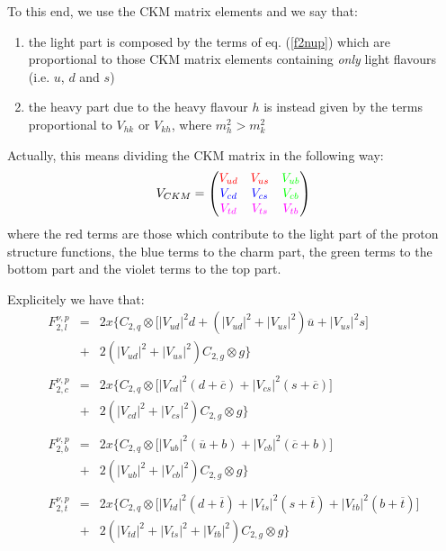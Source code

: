 \documentclass[10pt,a4paper]{article}
\begin{document}
To this end, we use the CKM matrix elements and we say that:
\begin{enumerate}
\item the light part is composed by the terms of eq. (\ref{f2nup})
  which are proportional to those CKM matrix elements containing
  \textit{only} light flavours (i.e. $u$, $d$ and $s$)
\item the heavy part due to the heavy flavour $h$ is instead given by
  the terms proportional to $V_{hk}$ or $V_{kh}$, where $m_h^2 >
  m_k^2$
\end{enumerate}
Actually, this means dividing the CKM matrix in the following way:
\begin{equation}
V_{CKM} =
\begin{pmatrix}
{\color{rosso}V_{ud}} & {\color{rosso}V_{us}} & {\color{verde}V_{ub}}\\
{\color{blu}V_{cd}} & {\color{blu}V_{cs}} & {\color{verde}V_{cb}}\\
{\color{viola}V_{td}} & {\color{viola}V_{ts}} & {\color{viola}V_{tb}}
\end{pmatrix}
\end{equation}
where the {\color{rosso} red terms} are those which contribute to the
{\color{rosso} light part} of the proton structure functions, the
{\color{blu} blue terms} to the {\color{blu} charm part}, the
{\color{verde} green terms} to the {\color{verde} bottom part} and the
{\color{viola} violet terms} to the {\color{viola} top part}.

Explicitely we have that:
\begin{equation}
\begin{array}{rcl}  
F_{2,l}^{\nu,p} &=& 2x\Big\{C_{2,q}\otimes\Big[|V_{ud}|^2 d +\left(|V_{ud}|^2+|V_{us}|^2\right)\overline{u} + |V_{us}|^2 s\Big]\\
                &+& 2\left(|V_{ud}|^2+|V_{us}|^2\right)C_{2,g}\otimes g\Big\}\\
\\
F_{2,c}^{\nu,p} &=& 2x\Big\{C_{2,q}\otimes\Big[|V_{cd}|^2(d+\overline{c}) + |V_{cs}|^2 (s+\overline{c})\Big]\\
                &+& 2\left(|V_{cd}|^2+|V_{cs}|^2\right)C_{2,g}\otimes g\Big\}\\
\\
F_{2,b}^{\nu,p} &=& 2x\Big\{C_{2,q}\otimes\Big[|V_{ub}|^2 (\overline{u}+b) + |V_{cb}|^2 (\overline{c}+b)\Big]\\
                &+& 2\left(|V_{ub}|^2+|V_{cb}|^2\right)C_{2,g}\otimes g\Big\}\\
\\
F_{2,t}^{\nu,p} &=& 2x\Big\{C_{2,q}\otimes\Big[|V_{td}|^2 (d +\overline{t})+ |V_{ts}|^2(s+\overline{t}) + |V_{tb}|^2(b+\overline{t})\Big]\\
                &+& 2\left(|V_{td}|^2 + |V_{ts}|^2 + |V_{tb}|^2\right)C_{2,g}\otimes g\Big\}
\end{array}
\end{equation}
\end{document}
